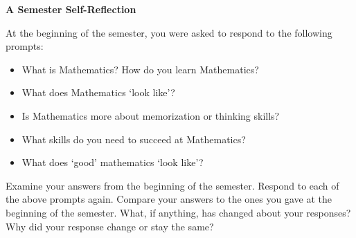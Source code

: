 \documentclass[11pt,letterpaper]{article}
\begin{document}

\begin{center} {\Large\bfseries A Semester Self-Reflection} \end{center}

At the beginning of the semester, you were asked to respond to the following prompts:
	\begin{itemize}
	\item What is Mathematics? How do you learn Mathematics?
	\item What does Mathematics `look like'?
	\item Is Mathematics more about memorization or thinking skills?
	\item What skills do you need to succeed at Mathematics?
	\item What does `good' mathematics `look like'?
	\end{itemize}
Examine your answers from the beginning of the semester. Respond to each of the above prompts again. Compare your answers to the ones you gave at the beginning of the semester. What, if anything, has changed about your responses? Why did your response change or stay the same?

\newpage

\phantom{.}
\end{document}
